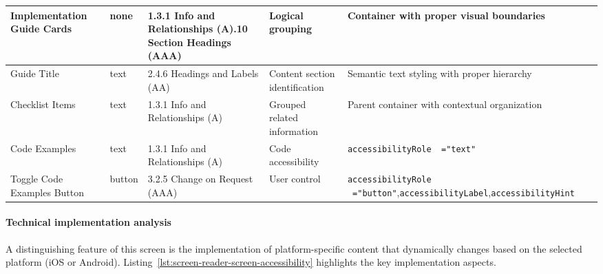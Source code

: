 \begin{longtable}[c]{|C{3cm}|C{2cm}|C{2.8cm}|C{3.2cm}|C{4.8cm}|}
\hline
Implementation Guide Cards & none & 1.3.1 Info and Relationships (A).10 Section Headings (AAA) & Logical grouping & Container with proper visual boundaries \\
\hline
Guide Title & text & 2.4.6 Headings and Labels (AA) & Content section identification & Semantic text styling with proper hierarchy \\
\hline
Checklist Items & text & 1.3.1 Info and Relationships (A) & Grouped related information & Parent container with contextual organization \\
\hline
Code Examples & text & 1.3.1 Info and Relationships (A) & Code accessibility & \texttt{accessibilityRole \ ="text"} \\
\hline
Toggle Code Examples Button & button & 3.2.5 Change on Request (AAA) & User control & \texttt{accessibilityRole \ ="button"},\newline \texttt{accessibilityLabel},\newline \texttt{accessibilityHint} \\
\hline
\end{longtable}
\FloatBarrier

\paragraph{Technical implementation analysis}

A distinguishing feature of this screen is the implementation of platform-specific content that dynamically changes based on the selected platform (iOS or Android). Listing~\ref{lst:screen-reader-screen-accessibility} highlights the key implementation aspects.

